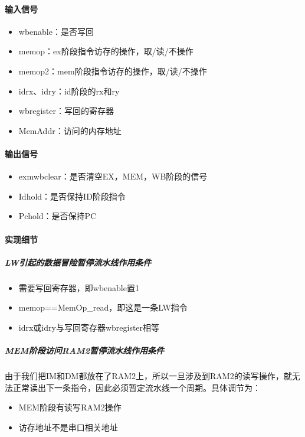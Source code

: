 \documentclass{article}
\begin{document}
\paragraph{输入信号}
\begin{itemize}
	\item wbenable：是否写回
	
	\item memop：ex阶段指令访存的操作，取/读/不操作 

	\item memop2：mem阶段指令访存的操作，取/读/不操作
	
	\item idrx、idry：id阶段的rx和ry 

	\item wbregister：写回的寄存器
	
	\item MemAddr：访问的内存地址 
\end{itemize}

\paragraph{输出信号}
\begin{itemize}
	\item exmwbclear：是否清空EX，MEM，WB阶段的信号
	
	\item Idhold：是否保持ID阶段指令 

	\item Pchold：是否保持PC
\end{itemize}

\paragraph{实现细节}

\subparagraph{LW引起的数据冒险暂停流水线作用条件}
	\begin{itemize}
	\item 需要写回寄存器，即wbenable置1
	\item memop==MemOp\_read，即这是一条LW指令
	\item idrx或idry与写回寄存器wbregister相等
	\end{itemize}

\subparagraph{MEM阶段访问RAM2暂停流水线作用条件}
由于我们把IM和DM都放在了RAM2上，所以一旦涉及到RAM2的读写操作，就无法正常读出下一条指令，因此必须暂定流水线一个周期。具体调节为：
	\begin{itemize}
		\item MEM阶段有读写RAM2操作
		\item 访存地址不是串口相关地址
	\end{itemize}
\end{document}
